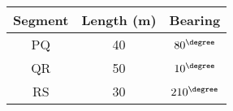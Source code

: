 \begin{tabular}{|c|c|c|}
\hline
Segment & Length (m) & Bearing \\
\hline
PQ & 40 & $80^\degree$ \\
QR & 50 & $10^\degree$ \\
RS & 30 & $210^\degree$ \\
\hline
\end{tabular}